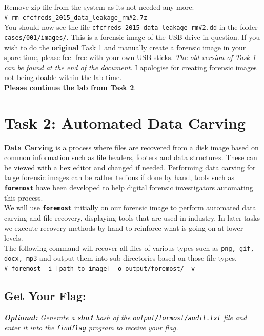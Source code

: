 \documentclass[a4paper,11pt]{article}
\begin{document}
\noindent
Remove zip file from the system as its not needed any more:\\
\verb|# rm cfcfreds_2015_data_leakage_rm#2.7z|\\

You should now see the file \verb|cfcfreds_2015_data_leakage_rm#2.dd| in the folder \texttt{cases/001/images/}. This is a forensic image of the USB drive in question. If you wish to do the \textbf{original} Task 1 and manually create a forensic image in your spare time, please feel free with your own USB sticks. \textit{The old version of Task 1 can be found at the end of the document.} I apologise for creating forensic images not being doable within the lab time.
\\

\noindent
\textbf{Please continue the lab from Task 2}.


\section{Task 2: Automated Data Carving}\label{sec:task2-auto-data-carving}
\textbf{Data Carving} is a process where files are recovered from a disk image based on common information such as file headers, footers and data structures. These can be viewed with a hex editor and changed if needed. Performing data carving for large forensic images can be rather tedious if done by hand, tools such as \texttt{\textbf{foremost}} have been developed to help digital forensic investigators automating this process. 
\\

We will use \texttt{\textbf{foremost}} initially on our forensic image to perform automated data carving and file recovery, displaying tools that are used in industry. In later tasks we execute recovery methods by hand to reinforce what is going on at lower levels.
\\

The following command will recover all files of various types such as \texttt{png, gif, docx, mp3} and output them into sub directories based on those file types.
\\

\noindent
\verb|# foremost -i [path-to-image] -o output/foremost/ -v|
\subsection*{Get Your Flag:}
\noindent
\textit{\textbf{Optional:} Generate a \textbf{\textit{sha1}} hash of the \texttt{output/formost/audit.txt} file and enter it into the \texttt{findflag} program to receive your flag.}
\end{document}
